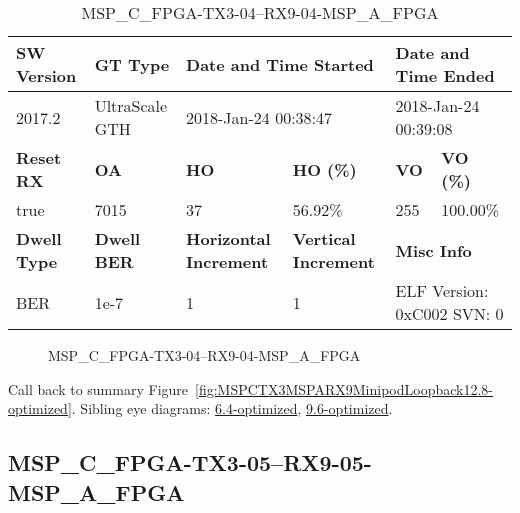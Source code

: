 \begin{table}[h]
\centering
\caption{MSP\_C\_FPGA-TX3-04--RX9-04-MSP\_A\_FPGA}
\label{tab:MSPCFPGATX304RX904MSPAFPGA12.8-optimized}
\begin{tabular}{@{}|l|l|l|l|l|l|@{}}
\toprule
\textbf{SW Version}                & \textbf{GT Type}   & \multicolumn{2}{l|}{\textbf{Date and Time Started}}            & \multicolumn{2}{l|}{\textbf{Date and Time Ended}}        \\ \midrule
2017.2                       & UltraScale GTH          & \multicolumn{2}{l|}{2018-Jan-24 00:38:47}                   & \multicolumn{2}{l|}{2018-Jan-24 00:39:08}               \\ \midrule
\textbf{Reset RX}                  & \textbf{OA} & \textbf{HO}   & \textbf{HO (\%)} & \textbf{VO} & \textbf{VO (\%)} \\ \midrule
true & 7015        & 37          & 56.92\%        & 255        & 100.00\%       \\ \midrule
\textbf{Dwell Type}                & \textbf{Dwell BER} & \textbf{Horizontal Increment} & \textbf{Vertical Increment}    & \multicolumn{2}{l|}{\textbf{Misc Info}}                  \\ \midrule
BER                            & 1e-7        & 1        & 1           & \multicolumn{2}{l|}{ELF Version: 0xC002 SVN: 0}                         \\ \bottomrule
\end{tabular}
\end{table}

\begin{figure}[h]
\caption{MSP\_C\_FPGA-TX3-04--RX9-04-MSP\_A\_FPGA} \label{fig:MSPCFPGATX304RX904MSPAFPGA12.8-optimized}
\end{figure}

Call back to summary Figure~\ref{fig:MSPCTX3MSPARX9MinipodLoopback12.8-optimized}.
Sibling eye diagrams: \hyperref[sec:MSPCFPGATX304RX904MSPAFPGA6.4-optimized]{6.4-optimized}, \hyperref[sec:MSPCFPGATX304RX904MSPAFPGA9.6-optimized]{9.6-optimized}.

\clearpage
\newpage


\subsection{MSP\_C\_FPGA-TX3-05--RX9-05-MSP\_A\_FPGA}\label{sec:MSPCFPGATX305RX905MSPAFPGA12.8-optimized}

